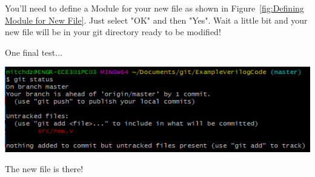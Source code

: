 \documentclass[12pt]{article}
\begin{document}
You'll need to define a Module for your new file as shown in Figure~\ref{fig:Defining Module for New File}. Just select "OK" and then "Yes". Wait a little bit and your new file will be in your git directory ready to be modified!

One final test...

\begin{center}
    \includegraphics[scale=1.0]{viv_15.PNG}
    \label{fig:Checking For The New File in Git}
\end{center}

The new file is there!
\end{document}
